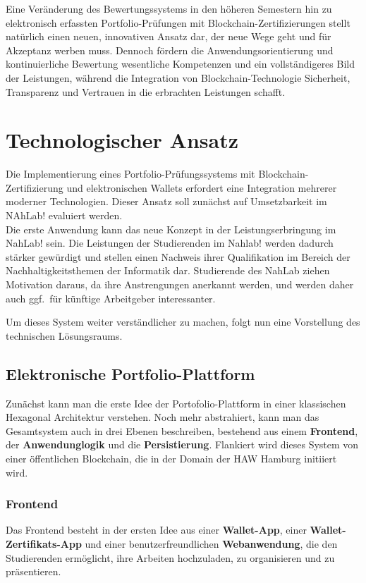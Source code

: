 \documentclass[conference]{IEEEtran}
\begin{document}
Eine Veränderung des Bewertungssystems in den höheren Semestern hin zu elektronisch erfassten Portfolio-Prüfungen mit Blockchain-Zertifizierungen stellt natürlich einen neuen, innovativen Ansatz dar, der neue Wege geht und für Akzeptanz werben muss. Dennoch fördern die Anwendungsorientierung und kontinuierliche Bewertung wesentliche Kompetenzen und ein vollständigeres Bild der Leistungen, während die Integration von Blockchain-Technologie Sicherheit, Transparenz und Vertrauen in die erbrachten Leistungen schafft.

\section{Technologischer Ansatz}
Die Implementierung eines Portfolio-Prüfungssystems mit Blockchain-Zertifizierung und elektronischen Wallets erfordert eine Integration mehrerer moderner Technologien. Dieser Ansatz soll zunächst auf Umsetzbarkeit im NAhLab! evaluiert werden.\\ Die erste Anwendung kann das neue Konzept in der Leistungserbringung im NahLab! sein.
Die Leistungen der Studierenden im Nahlab! werden dadurch stärker gewürdigt und stellen einen Nachweis ihrer Qualifikation im Bereich der Nachhaltigkeitsthemen der Informatik dar. Studierende des NahLab ziehen Motivation daraus, da ihre Anstrengungen anerkannt werden, und werden daher auch ggf.~für künftige Arbeitgeber interessanter.

Um dieses System weiter verständlicher zu machen, folgt nun eine Vorstellung des  technischen Lösungsraums.

\subsection{Elektronische Portfolio-Plattform}
Zunächst kann man die erste Idee der Portofolio-Plattform in einer klassischen Hexagonal Architektur \cite{tanenbaum2017distributed} verstehen. Noch mehr abstrahiert, kann man das Gesamtsystem auch in drei Ebenen beschreiben, bestehend aus einem \textbf{Frontend}, der \textbf{Anwendunglogik} und die \textbf{Persistierung}. Flankiert wird dieses System von einer öffentlichen Blockchain, die in der Domain der HAW Hamburg initiiert wird. 

\subsubsection{Frontend}
Das Frontend besteht in der ersten Idee aus einer \textbf{Wallet-App}, einer \textbf{Wallet-Zertifikats-App} und einer benutzerfreundlichen \textbf{Webanwendung}, die den Studierenden ermöglicht, ihre Arbeiten hochzuladen, zu organisieren und zu präsentieren. 
\end{document}

